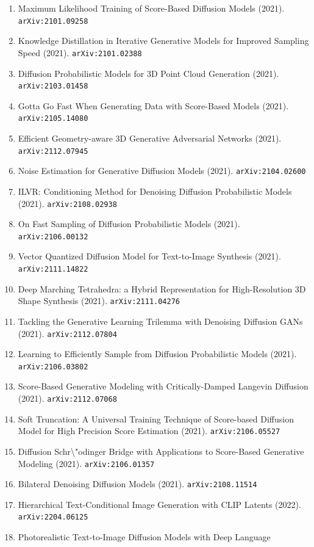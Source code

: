 \documentclass[11pt]{article}
\begin{document}
\begin{enumerate}
  \item Maximum Likelihood Training of Score-Based Diffusion Models (2021). \texttt{arXiv:2101.09258}
  \item Knowledge Distillation in Iterative Generative Models for Improved
  Sampling Speed (2021). \texttt{arXiv:2101.02388}
  \item Diffusion Probabilistic Models for 3D Point Cloud Generation (2021). \texttt{arXiv:2103.01458}
  \item Gotta Go Fast When Generating Data with Score-Based Models (2021). \texttt{arXiv:2105.14080}
  \item Efficient Geometry-aware 3D Generative Adversarial Networks (2021). \texttt{arXiv:2112.07945}
  \item Noise Estimation for Generative Diffusion Models (2021). \texttt{arXiv:2104.02600}
  \item ILVR: Conditioning Method for Denoising Diffusion Probabilistic Models (2021). \texttt{arXiv:2108.02938}
  \item On Fast Sampling of Diffusion Probabilistic Models (2021). \texttt{arXiv:2106.00132}
  \item Vector Quantized Diffusion Model for Text-to-Image Synthesis (2021). \texttt{arXiv:2111.14822}
  \item Deep Marching Tetrahedra: a Hybrid Representation for High-Resolution 3D
  Shape Synthesis (2021). \texttt{arXiv:2111.04276}
  \item Tackling the Generative Learning Trilemma with Denoising Diffusion GANs (2021). \texttt{arXiv:2112.07804}
  \item Learning to Efficiently Sample from Diffusion Probabilistic Models (2021). \texttt{arXiv:2106.03802}
  \item Score-Based Generative Modeling with Critically-Damped Langevin
  Diffusion (2021). \texttt{arXiv:2112.07068}
  \item Soft Truncation: A Universal Training Technique of Score-based Diffusion
  Model for High Precision Score Estimation (2021). \texttt{arXiv:2106.05527}
  \item Diffusion Schr\textbackslash{}"odinger Bridge with Applications to Score-Based
  Generative Modeling (2021). \texttt{arXiv:2106.01357}
  \item Bilateral Denoising Diffusion Models (2021). \texttt{arXiv:2108.11514}
  \item Hierarchical Text-Conditional Image Generation with CLIP Latents (2022). \texttt{arXiv:2204.06125}
  \item Photorealistic Text-to-Image Diffusion Models with Deep Language

\end{enumerate}
\end{document}
